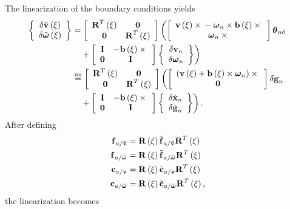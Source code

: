 The linearization of the boundary conditions yields
\begin{subequations}
\begin{align}
	\cubr{\cvvect{
		\delta\tilde{\T{v}}\plbr{\xi} \\
		\delta\tilde{\T{\omega}}\plbr{\xi}
	}}
	&=
	\sqbr{\matr{cc}{
		\TT{R}^T\plbr{\xi} & \TT{0} \\
		\TT{0} & \TT{R}^T\plbr{\xi}
	}} \lplbr{
		\sqbr{\cvvect{
			\T{v}\plbr{\xi}\times{}
				- \T{\omega}_n\times\T{b}\plbr{\xi}\times{}
			\\
			\T{\omega}_n\times{}
		}} \T{\theta}_{n\delta}
	} \nonumber \\
	& \hphantom{= } \rplbr{
		\mbox{} + \sqbr{\matr{cc}{
			\TT{I} & -\T{b}\plbr{\xi}\times{} \\
			\TT{0} & \TT{I}
		}} \cubr{\cvvect{
			\delta\T{v}_n \\
			\delta\T{\omega}_n
		}}
	}
	\\
	&\equu 
	\sqbr{\matr{cc}{
		\TT{R}^T\plbr{\xi} & \TT{0} \\
		\TT{0} & \TT{R}^T\plbr{\xi}
	}} \lplbr{
		\sqbr{\cvvect{
			\plbr{\T{v}\plbr{\xi} + \T{b}\plbr{\xi}\times \T{\omega}_n}\times{}
			\\
			\T{0}
		}} \delta\T{g}_n
	} \nonumber \\
	& \hphantom{= } \rplbr{
		\mbox{} + \sqbr{\matr{cc}{
			\TT{I} & -\T{b}\plbr{\xi}\times{} \\
			\TT{0} & \TT{I}
		}} \cubr{\cvvect{
			\delta\dot{\T{x}}_n \\
			\delta\dot{\T{g}}_n
		}}
	}
	.
\end{align}
\end{subequations}
After defining
\begin{subequations}
\begin{align}
	\T{f}_{a/\tilde{\T{v}}} &= \TT{R}\plbr{\xi} \tilde{\T{f}}_{a/\tilde{\T{v}}} \TT{R}^T\plbr{\xi} \\
	\T{f}_{a/\tilde{\T{\omega}}} &= \TT{R}\plbr{\xi} \tilde{\T{f}}_{a/\tilde{\T{\omega}}} \TT{R}^T\plbr{\xi} \\
	\T{c}_{a/\tilde{\T{v}}} &= \TT{R}\plbr{\xi} \tilde{\T{c}}_{a/\tilde{\T{v}}} \TT{R}^T\plbr{\xi} \\
	\T{c}_{a/\tilde{\T{\omega}}} &= \TT{R}\plbr{\xi} \tilde{\T{c}}_{a/\tilde{\T{\omega}}} \TT{R}^T\plbr{\xi}
	,
\end{align}
\end{subequations}
the linearization becomes
